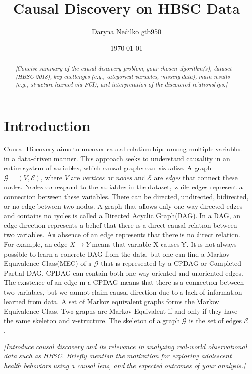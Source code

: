 \documentclass[a4paper]{article}
\title{Causal Discovery on HBSC Data}
\author{Daryna Nedilko gtb950}
\date{\today}
\begin{document}
\maketitle

\begin{abstract}
\textit{[Concise summary of the causal discovery problem, your chosen algorithm(s), dataset (HBSC 2018), key challenges (e.g., categorical variables, missing data), main results (e.g., structure learned via FCI), and interpretation of the discovered relationships.]}

\end{abstract}

\section{Introduction}
\label{sec:introduction}
Causal Discovery aims to uncover causal relationships among multiple variables in a data-driven manner. This approach seeks to understand causality in an entire system of variables, which causal graphs can visualise. A graph $\mathcal{G} = (V, \mathcal{\mathcal{E}})$, where $V$ are \textit{vertices or nodes} and $\mathcal{E}$ are \textit{edges} that connect these nodes. Nodes correspond to the variables in the dataset, while edges represent a connection between these variables. There can be directed, undirected, bidirected, or no edge between two nodes. A graph that allows only one-way directed edges and contains no cycles is called a Directed Acyclic Graph(DAG). In a DAG, an edge direction represents a belief that there is a direct causal relation between two variables. An absence of an edge represents that there is no direct relation. For example, an edge $X \rightarrow Y$ means that variable X causes Y. It is not always possible to learn a concrete DAG from the data, but one can find a Markov Equivalence Class(MEC) of a $\mathcal{G}$ that is represented by a CPDAG or Completed Partial DAG. CPDAG can contain both one-way oriented and unoriented edges. The existence of an edge in a CPDAG means that there is a connection between two variables, but we cannot claim causal direction due to a lack of information learned from data. A set of Markov equivalent graphs forms the Markov Equivalence Class. Two graphs are Markov Equivalent if and only if they have the same skeleton and v-structure. The skeleton of a graph $\mathcal{G}$ is the set of edges $\mathcal{E}$. 

\textit{[Introduce causal discovery and its relevance in analyzing real-world observational data such as HBSC. Briefly mention the motivation for exploring adolescent health behaviors using a causal lens, and the expected outcomes of your analysis.]}
\end{document}
